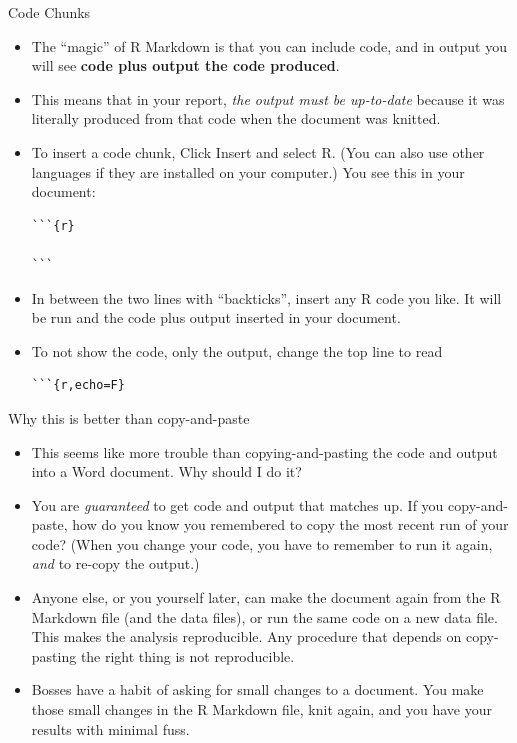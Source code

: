 \documentclass[unknownkeysallowed]{beamer}\usepackage[]{graphicx}\usepackage[]{color}
\begin{document}
\begin{frame}[fragile]{Code Chunks}
  
  \begin{itemize}
  \item The ``magic'' of R Markdown is that you can include code, and
    in output you will see \textbf{code plus output the code
      produced}.
  \item This means that in your report, \emph{the output must be
      up-to-date} because it was literally produced from that code
    when the document was knitted.
  \item To insert a code chunk, Click Insert and select R. (You can
    also use other languages if they are installed on your computer.)
    You see this in your document:
    
\begin{verbatim}
```{r}

```
\end{verbatim}
    
  \item In between the two lines with ``backticks'', insert any R code
    you like. It will be run and the code plus output inserted in your
    document. 
  \item To not show the code, only the output, change the top line to read
    
\begin{verbatim}
```{r,echo=F}
\end{verbatim}
  \end{itemize}
  
\end{frame}

\begin{frame}[fragile]{Why this is better than copy-and-paste}
  
  \begin{itemize}
  \item This seems like more trouble than copying-and-pasting the code
    and output into a Word document. Why should I do it?
  \item You are \emph{guaranteed} to get code and output that matches
    up. If you copy-and-paste, how do you know you remembered to copy
    the most recent run of your code? (When you change your code, you
    have to remember to run it again, \emph{and} to re-copy the
    output.)
  \item Anyone else, or you yourself later, can make the document
    again from the R Markdown file (and the data files), or run the
    same code on a new data file. This makes the analysis
    reproducible. Any procedure that depends on copy-pasting the right
    thing is not reproducible.
  \item Bosses have a habit of asking for small changes to a
    document. You make those small changes in the R Markdown file,
    knit again, and you have your results with minimal fuss.
  \end{itemize}
  
\end{frame}
\end{document}
